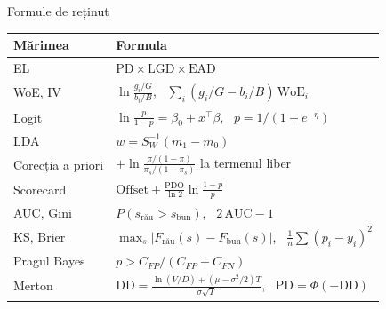 \begin{frame}{Formule de reținut}
\itemsize{\small}
{\renewcommand{\arraystretch}{1.4}\begin{center}
\small
\begin{tabular}{ll}
\toprule
\textbf{Mărimea} & \textbf{Formula} \\
\midrule
EL & $\mathrm{PD} \times \mathrm{LGD} \times \mathrm{EAD}$ \\
WoE, IV & $\ln\frac{g_i/G}{b_i/B}$, \ $\sum_i (g_i/G - b_i/B)\,\mathrm{WoE}_i$ \\
Logit & $\ln\frac{p}{1 - p} = \beta_0 + x^\top\beta$, \ $p = 1/(1 + e^{-\eta})$ \\
LDA & $w = S_W^{-1}(m_1 - m_0)$ \\
Corecția a priori & $+\ln\frac{\pi/(1 - \pi)}{\pi_s/(1 - \pi_s)}$ la termenul liber \\
Scorecard & $\text{Offset} + \frac{\text{PDO}}{\ln 2}\ln\frac{1 - p}{p}$ \\
AUC, Gini & $P(s_{\text{rău}} > s_{\text{bun}})$, \ $2\,\mathrm{AUC} - 1$ \\
KS, Brier & $\max_s|F_{\text{rău}}(s) - F_{\text{bun}}(s)|$, \ $\frac1n\sum(p_i - y_i)^2$ \\
Pragul Bayes & $p > C_{FP}/(C_{FP} + C_{FN})$ \\
Merton & $\mathrm{DD} = \frac{\ln(V/D) + (\mu - \sigma^2/2)T}{\sigma\sqrt{T}}$, \ $\mathrm{PD} = \Phi(-\mathrm{DD})$ \\
\bottomrule
\end{tabular}
\end{center}
}
\end{frame}

